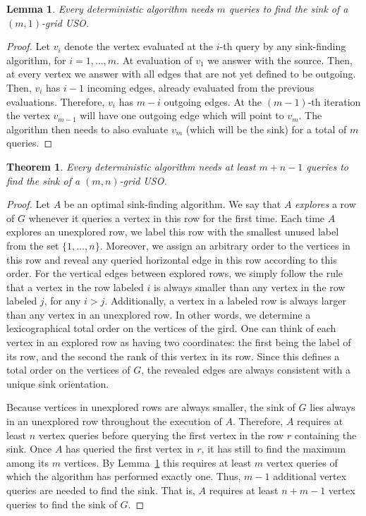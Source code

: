 \documentclass[a4paper,10pt]{article}
\newtheorem{lemma}{Lemma}
\newtheorem{theorem}{Theorem}
\begin{document}
\begin{lemma}\label{lem:kx1}
Every deterministic algorithm needs $m$ queries to find the sink of a $(m,1)$-grid USO. 
\end{lemma}
\begin{proof}
Let $v_i$ denote the vertex evaluated at the $i$-th query by any sink-finding algorithm, for $i=1,\ldots, m$. At evaluation of $v_1$ we answer with the source. Then, at every vertex 
we answer with all edges that are not yet defined to be outgoing. Then, $v_i$ has $i-1$ incoming edges, already evaluated from the previous evaluations. 
Therefore, $v_i$ has $m-i$ outgoing edges. At the $(m-1)$-th iteration the vertex $v_{m-1}$ will have one outgoing edge which will point to $v_m$.
The algorithm then needs to also evaluate $v_m$ (which will be the sink) for a total of $m$ queries. 
\end{proof}

\begin{theorem} \label{thm:lowerbound}
Every deterministic algorithm needs at least $m+n-1$ queries to find the sink of a $(m,n)$-grid USO. 
\end{theorem}
\begin{proof}
Let $A$ be an optimal sink-finding algorithm. We say that $A$ \emph{explores} a row of $G$ whenever it queries a vertex in this row for the first time.
Each time $A$ explores an unexplored row, we label this row with the smallest unused label from the set $\{1, \ldots, n\}$. Moreover, we assign an arbitrary order to the vertices in this row and reveal any queried horizontal edge in this row according to this order. For the vertical edges between explored rows, we simply follow the rule that a vertex in the row labeled $i$ is always smaller than any vertex in the row labeled $j$, for any $i > j$. Additionally, a vertex in a labeled row is always larger than any vertex in an unexplored row. In other words, we determine a lexicographical total order on the vertices of the gird. One can think of each vertex in an explored row as having two coordinates: the first being the label of its row, and the second the rank of this vertex in its row.
Since this defines a total order on the vertices of $G$, the revealed edges are always consistent with a unique sink orientation.

Because vertices in unexplored rows are always smaller, the sink of $G$ lies always in an unexplored row throughout the execution of $A$. Therefore, $A$ requires at least $n$ vertex queries before querying the first vertex in the row $r$ containing the sink. Once $A$ has queried the first vertex in $r$, it has still to find the maximum among its $m$ vertices. 
By Lemma~\ref{lem:kx1} this requires at least $m$ vertex queries of which the algorithm has performed exactly one. Thus, $m-1$ additional vertex queries are needed to find the sink. That is, $A$ requires at least $n+m-1$ vertex queries to find the sink of $G$. 
\end{proof}
\end{document}
